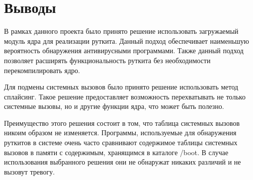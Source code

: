 \section{Выводы}%
\label{sec:vyvody}

В рамках данного проекта было принято решение использовать загружаемый модуль ядра для реализации руткита. Данный подход обеспечивает наименьшую вероятность обнаружения антивирусными программами. Также данный подход позволяет расширять функциональность руткита без необходимости перекомпилировать ядро.

Для подмены системных вызовов было принято решение использовать метод сплайсинг. Такое решение предоставляет возможность перехватывать не только системные вызовы, но и другие функции ядра, что может быть полезно.

Преимущество этого решения состоит в том, что таблица системных вызовов никоим образом не изменяется. Программы, используемые для обнаружения руткитов в системе очень часто сравнивают содержимое таблицы системных вызовов в памяти с содержимым, хранящимся в каталоге /boot. В случае использования выбранного решения они не обнаружат никаких различий и не вызовут тревогу.
